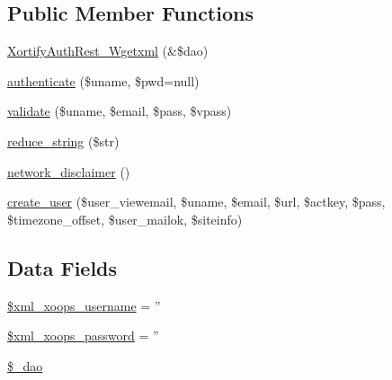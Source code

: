 \subsection*{Public Member Functions}
\begin{DoxyCompactItemize}
\item 
\hyperlink{class_xortify_auth_rest___wgetxml_a84ac6c33916f84f4dc6c94124aae0cb4}{Xortify\-Auth\-Rest\-\_\-\-Wgetxml} (\&\$dao)
\item 
\hyperlink{class_xortify_auth_rest___wgetxml_a00678ba307326b734e6c679f28bea315}{authenticate} (\$uname, \$pwd=null)
\item 
\hyperlink{class_xortify_auth_rest___wgetxml_a91121a1b702dfd20fb65a027c8ed26ec}{validate} (\$uname, \$email, \$pass, \$vpass)
\item 
\hyperlink{class_xortify_auth_rest___wgetxml_ae463a3baa44e95fa5b5151ab2334df1c}{reduce\-\_\-string} (\$str)
\item 
\hyperlink{class_xortify_auth_rest___wgetxml_a1874c27b6f81a3f2ff9015405ad0f8bc}{network\-\_\-disclaimer} ()
\item 
\hyperlink{class_xortify_auth_rest___wgetxml_ac72efc5ad313a592cf6706876f56f7ec}{create\-\_\-user} (\$user\-\_\-viewemail, \$uname, \$email, \$url, \$actkey, \$pass, \$timezone\-\_\-offset, \$user\-\_\-mailok, \$siteinfo)
\end{DoxyCompactItemize}
\subsection*{Data Fields}
\begin{DoxyCompactItemize}
\item 
\hyperlink{class_xortify_auth_rest___wgetxml_a725df0dd6b578e15522ed15945e5901c}{\$xml\-\_\-xoops\-\_\-username} = ''
\item 
\hyperlink{class_xortify_auth_rest___wgetxml_a8ec2889165c837354fded1cedbd42157}{\$xml\-\_\-xoops\-\_\-password} = ''
\item 
\hyperlink{class_xortify_auth_rest___wgetxml_a12a029c610f699b4b25e79a1f64a3485}{\$\-\_\-dao}
\end{DoxyCompactItemize}


